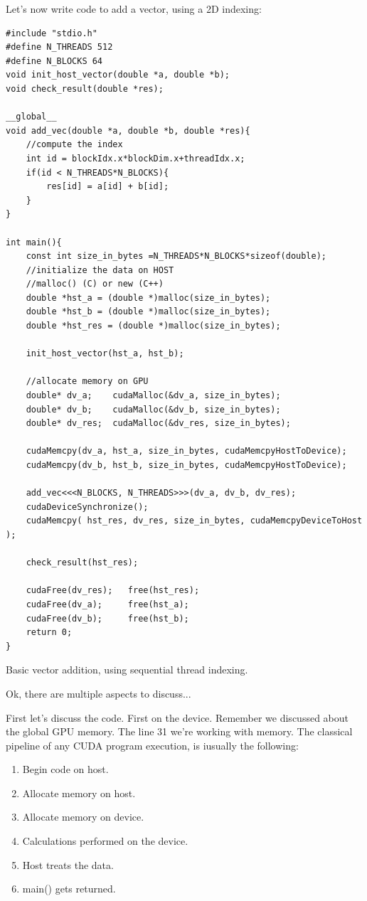 \documentclass[12pt]{article}
\begin{document}
Let's now write code to add a vector, using a 2D indexing: 

\begin{listing}
\begin{verbatim}
#include "stdio.h"
#define N_THREADS 512
#define N_BLOCKS 64 
void init_host_vector(double *a, double *b);
void check_result(double *res);

__global__ 
void add_vec(double *a, double *b, double *res){
    //compute the index
    int id = blockIdx.x*blockDim.x+threadIdx.x;
    if(id < N_THREADS*N_BLOCKS){
        res[id] = a[id] + b[id];
    }
}

int main(){
    const int size_in_bytes =N_THREADS*N_BLOCKS*sizeof(double);
    //initialize the data on HOST
    //malloc() (C) or new (C++) 
    double *hst_a = (double *)malloc(size_in_bytes);
    double *hst_b = (double *)malloc(size_in_bytes);
    double *hst_res = (double *)malloc(size_in_bytes);

    init_host_vector(hst_a, hst_b);

    //allocate memory on GPU
    double* dv_a;    cudaMalloc(&dv_a, size_in_bytes);
    double* dv_b;    cudaMalloc(&dv_b, size_in_bytes);
    double* dv_res;  cudaMalloc(&dv_res, size_in_bytes);

    cudaMemcpy(dv_a, hst_a, size_in_bytes, cudaMemcpyHostToDevice);
    cudaMemcpy(dv_b, hst_b, size_in_bytes, cudaMemcpyHostToDevice);

    add_vec<<<N_BLOCKS, N_THREADS>>>(dv_a, dv_b, dv_res);
    cudaDeviceSynchronize();
    cudaMemcpy( hst_res, dv_res, size_in_bytes, cudaMemcpyDeviceToHost );

    check_result(hst_res);

    cudaFree(dv_res);   free(hst_res);
    cudaFree(dv_a);     free(hst_a);  
    cudaFree(dv_b);     free(hst_b);
    return 0;
}
\end{verbatim}
    \caption{Basic vector addition, using sequential thread indexing. \cite{tuomanen2018hands}}
\end{listing}

Ok, there are multiple aspects to discuss...

First let's discuss the code. First on the device. Remember we discussed about the global GPU memory. 
The line 31 we're working with memory. The classical pipeline of any CUDA program
execution, is iusually the following:

\begin{enumerate}
\setlength\itemsep{-0.5em}
   \item Begin code on host.
   \item Allocate memory on host.
   \item Allocate memory on device.
   \item Calculations performed on the device.
   \item Host treats the data.
   \item main() gets returned.
\end{enumerate} 
\end{document}
